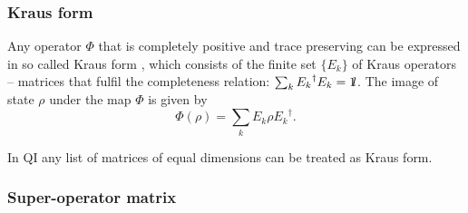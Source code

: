 \documentclass[a4paper,11pt]{elsart}
\newcommand{\1}{{\rm 1\hspace{-0.9mm}l}}
\newcommand{\qi}{QI}
\begin{document}
%
%




\subsubsection{Kraus form}
Any operator $\Phi$ that is completely positive and trace preserving can be
expressed in so called Kraus form \cite{BZ06}, which consists
of the finite set $\{E_k\}$ of Kraus operators -- matrices that fulfil the
completeness relation: $\sum_k {E_k}^\dagger E_k=\1$.
The image of state $\rho$ under 
the map $\Phi$ is given by 
\begin{equation}
    \Phi(\rho)=\sum_k E_k \rho {E_k}^\dagger.
\end{equation}

In \qi{} any list of matrices of equal dimensions can be treated as Kraus form.


\subsubsection{Super-operator matrix}
\end{document}

